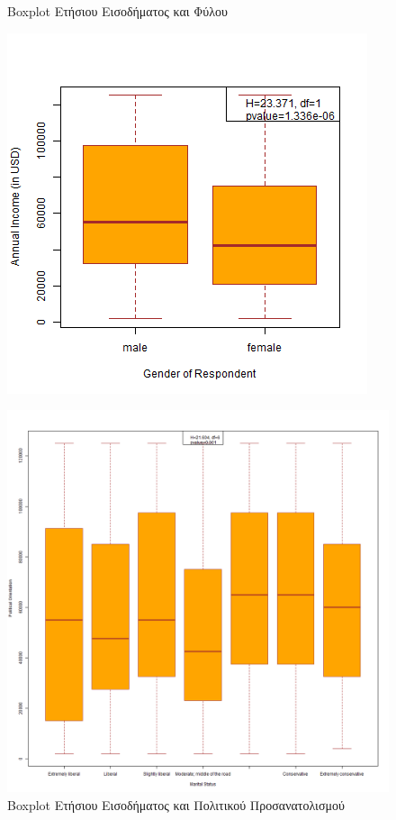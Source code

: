 \documentclass[10pt, letterpaper]{article}
\begin{document}
        \begin{figure}[h!]
        \centering
            \begin{minipage}{.5\textwidth}
                \caption{Boxplot Ετήσιου Εισοδήματος και Φύλου}
                \label{incomegenderplot}
                \centering
                \includegraphics[width=0.9\linewidth, keepaspectratio]{resources/Income_Gender_Plot.png}
            \end{minipage}%
            \begin{minipage}{.5\textwidth}
                \caption{Boxplot Ετήσιου Εισοδήματος και Πολιτικού Προσανατολισμού}
                \label{incomepoliticalplot}
                \centering
                \includegraphics[width=0.9\linewidth]{resources/Income_PoliticalOrientation_Plot.png}
            \end{minipage}
            \label{boxplots2}
        \end{figure}
        
\end{document}
